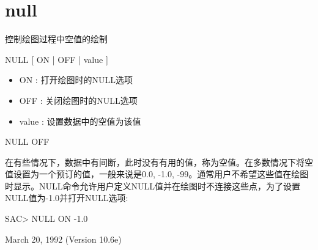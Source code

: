 \section{null}
\label{cmd:null}

控制绘图过程中空值的绘制

NULL [ ON | OFF | value ]

\begin{itemize}
\item ON :  打开绘图时的NULL选项 
\item OFF : 关闭绘图时的NULL选项 
\item value : 设置数据中的空值为该值 
\end{itemize}

NULL OFF

在有些情况下，数据中有间断，此时没有有用的值，称为空值。在多数情况下将空值设置为一个预订的值，一般来说是0.0, -1.0, -99。通常用户不希望这些值在绘图时显示。NULL命令允许用户定义NULL值并在绘图时不连接这些点，为了设置NULL值为-1.0并打开NULL选项:
\begin{SACCode}
SAC> NULL ON -1.0
\end{SACCode}

March 20, 1992 (Version 10.6e)
